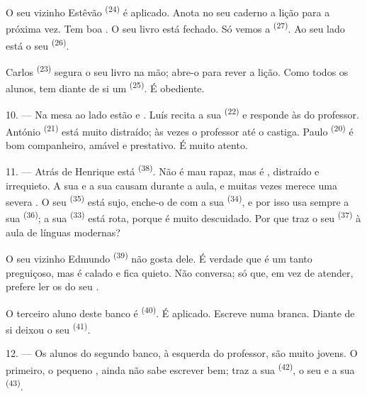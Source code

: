 O seu vizinho Estêvão \textsuperscript{(24)} é aplicado. Anota no seu caderno a
lição para a próxima vez. Tem boa . O seu livro está
fechado. Só vemos a  \textsuperscript{(27)}. Ao seu lado está o seu
 \textsuperscript{(26)}.

Carlos \textsuperscript{(23)} segura o seu livro na mão; abre-o para rever a
lição. Como todos os alunos, tem diante de si um 
\textsuperscript{(25)}. É obediente.

10. --- Na mesa ao lado estão  e . Luís
recita a sua  \textsuperscript{(22)} e responde às 
do professor. António \textsuperscript{(21)} está muito distraído; às vezes o
professor até o castiga. Paulo \textsuperscript{(20)} é bom companheiro, amável
e prestativo. É muito atento.

\VUsaut{4.2mm}
\VUsaut{3.2mm}

11. --- Atrás de Henrique está  \textsuperscript{(38)}. Não é mau
rapaz, mas é , distraído e irrequieto. A sua
 e a sua  causam 
durante a aula, e muitas vezes merece uma severa . O
seu  \textsuperscript{(35)} está sujo, enche-o de
 com a sua  \textsuperscript{(34)}, e por
isso usa sempre a sua  \textsuperscript{(36)}; a sua
 \textsuperscript{(33)} está rota, porque é muito descuidado. Por
que traz o seu  \textsuperscript{(37)} à aula de línguas
modernas?

O seu vizinho Edmundo \textsuperscript{(39)} não gosta dele. É verdade que é um
tanto preguiçoso, mas é calado e fica quieto. Não conversa; só que, em
vez de atender, prefere ler os  do seu .

O terceiro aluno deste banco é  \textsuperscript{(40)}. É
aplicado. Escreve numa  branca. Diante de si
deixou o seu  \textsuperscript{(41)}.

12. --- Os alunos do segundo banco, à esquerda do professor, são muito
jovens. O primeiro, o pequeno , ainda não sabe escrever
bem; traz a sua  \textsuperscript{(42)}, o seu  e a sua  \textsuperscript{(43)}.


